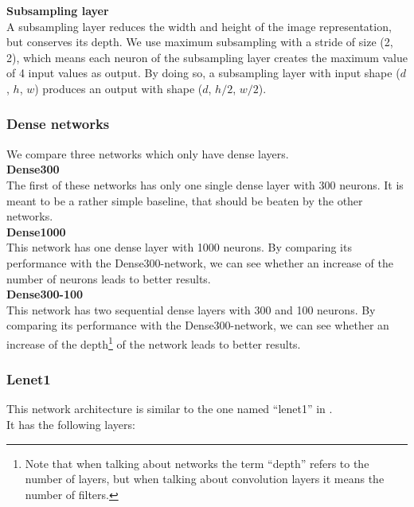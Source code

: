 \textbf{Subsampling layer}\\

A subsampling layer reduces the width and height of the image representation,
but conserves its depth.
We use maximum subsampling with a stride of size (2, 2), which means each neuron of the subsampling layer
creates the maximum value of 4 input values as output.
By doing so, a subsampling layer with input shape ($d$, $h$, $w$) produces an output with shape ($d$, $h/2$, $w/2$).

\subsubsection{Dense networks}

We compare three networks which only have dense layers.\\

\textbf{Dense300}\\

The first of these networks has only one single dense layer with 300 neurons.
It is meant to be a rather simple baseline, that should be beaten by the other networks.\\

\textbf{Dense1000}\\

This network has one dense layer with 1000 neurons.
By comparing its performance with the Dense300-network, we can see whether an increase of the number of neurons
leads to better results.\\

\textbf{Dense300-100}\\

This network has two sequential dense layers with 300 and 100 neurons.
By comparing its performance with the Dense300-network, we can see whether an increase of the
depth\footnote{Note that when talking about networks the term ``depth'' refers to the number of layers,
but when talking about convolution layers it means the number of filters.}
of the network
leads to better results.

\subsubsection{Lenet1}

This network architecture is similar to the one named ``lenet1''
in \cite{lenet1}.\\

It has the following layers:\\

